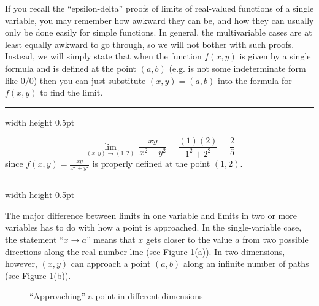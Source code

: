 If you recall the ``epsilon-delta'' proofs of limits of real-valued functions of a single variable, you may remember
how awkward they can be, and how they can usually only be done easily for simple functions. In general, the
multivariable cases are at least equally awkward to go through, so we will not bother with such proofs. Instead, we
will simply state that when the function $f(x,y)$ is given by a single formula and is defined at the point
$(a,b)$ (e.g. is not some indeterminate form like $0/0$) then you can just substitute $(x,y) = (a,b)$ into the formula
for $f(x,y)$ to find the limit.

\vspace{4mm}
\hrule width \textwidth height 0.5pt
\begin{exmp}
 \begin{displaymath}
 \lim_{(x,y) \to (1,2)}~ \frac{xy}{x^2 + y^2} = \frac{(1)(2)}{1^2 + 2^2} = \frac{2}{5}
 \end{displaymath}
 since $f(x,y) = \frac{xy}{x^2 + y^2}$ is properly defined at the point $(1,2)$.
\end{exmp}
\hrule width \textwidth height 0.5pt
\vspace{4mm}

The major difference between limits in one variable and limits in two or more variables has to do with how a point is
approached. In the single-variable case, the statement ``$x \rightarrow a$'' means that $x$ gets closer to the value $a$
from two possible directions along the real number line (see
Figure \ref{fig:mlim}(a)). In two dimensions, however, $(x,y)$ can approach a point $(a,b)$ along an infinite
number of paths (see Figure \ref{fig:mlim}(b)).

\begin{figure}[h]
 \centering
 \qquad
 \caption[]{\quad ``Approaching'' a point in different dimensions}
 \label{fig:mlim}
\end{figure}

